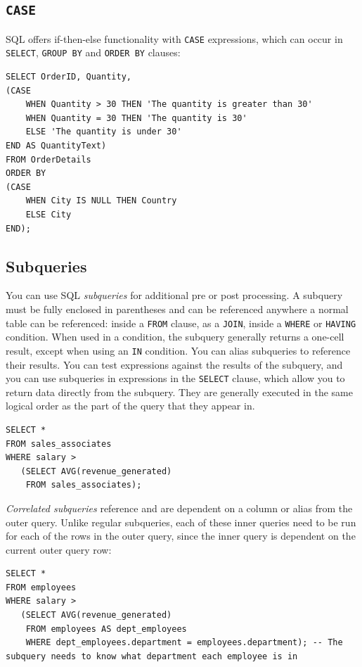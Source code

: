 \documentclass[table, xcdraw]{article}%
\begin{document}
\subsection{\texttt{CASE}}

SQL offers if-then-else functionality with \texttt{CASE} expressions, which can occur in \texttt{SELECT}, \texttt{GROUP BY} and \texttt{ORDER BY} clauses:

\begin{verbatim}
SELECT OrderID, Quantity,
(CASE
    WHEN Quantity > 30 THEN 'The quantity is greater than 30'
    WHEN Quantity = 30 THEN 'The quantity is 30'
    ELSE 'The quantity is under 30'
END AS QuantityText)
FROM OrderDetails
ORDER BY
(CASE
    WHEN City IS NULL THEN Country
    ELSE City
END);
\end{verbatim}

\subsection{Subqueries}

You can use SQL \emph{subqueries} for additional pre or post processing. A subquery must be fully enclosed in parentheses and can be referenced anywhere a normal table can be referenced: inside a \texttt{FROM} clause, as a \texttt{JOIN}, inside a \texttt{WHERE} or \texttt{HAVING} condition. When used in a condition, the subquery generally returns a one-cell result, except when using an \texttt{IN} condition. You can alias subqueries to reference their results. You can test expressions against the results of the subquery, and you can use subqueries in expressions in the \texttt{SELECT} clause, which allow you to return data directly from the subquery. They are generally executed in the same logical order as the part of the query that they appear in.

\begin{verbatim}
SELECT *
FROM sales_associates
WHERE salary > 
   (SELECT AVG(revenue_generated)
    FROM sales_associates);
\end{verbatim}

\emph{Correlated subqueries} reference and are dependent on a column or alias from the outer query. Unlike regular subqueries, each of these inner queries need to be run for each of the rows in the outer query, since the inner query is dependent on the current outer query row:

\begin{verbatim}
SELECT *
FROM employees
WHERE salary > 
   (SELECT AVG(revenue_generated)
    FROM employees AS dept_employees
    WHERE dept_employees.department = employees.department); -- The subquery needs to know what department each employee is in
\end{verbatim}
\end{document}
